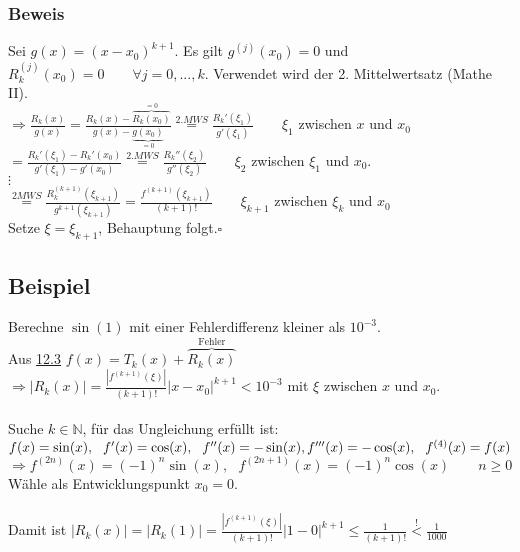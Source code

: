 \documentclass[a4paper, 12pt,titlepage, pdf, headsepline]{article}
\newcommand{\N}{\mathds{N}}
\newcommand{\qed}{\hfill$\square$}
\renewcommand{\>}{\rightarrow}
\renewcommand{\*}{\cdot}
\begin{document}
\subsubsection*{Beweis}
Sei $g(x) = (x-x_0)^{k+1}$. Es gilt $g^{(j)}(x_0) = 0$ und $R_k^{(j)}(x_0) = 0 \qquad \forall j = 0,...,k.$ Verwendet wird der 2. Mittelwertsatz (Mathe II).\\
$\Rightarrow \frac{R_k(x)}{g(x)} = \frac{R_k(x) - \overbrace{R_k(x_0)}^{=0}}{g(x) - \underbrace{g(x_0)}_{=0}} \overset{2.MWS}{=} \frac{R_k'(\xi_1)}{g'(\xi_1)} \qquad \xi_1$ zwischen $x$ und $x_0$\\
\noindent\hspace*{15mm}$= \frac{R_k'(\xi_1) - R_k'(x_0)}{g'(\xi_1) - g'(x_0)} \overset{2.MWS}{=} \frac{R_k''(\xi_2)}{g''(\xi_2)}\qquad \xi_2$ zwischen $\xi_1$ und $x_0$.\\
\noindent\hspace*{16mm}$\vdots$\\
\noindent\hspace*{11.5mm}$\overset{2MWS}{=} \frac{R_k^{(k+1)}(\xi_{k+1})}{g^{k+1}(\xi_{k+1})} = \frac{f^{(k+1)}(\xi_{k+1})}{(k+1)!}\qquad \xi_{k+1}$ zwischen $\xi_k$ und $x_0$\\
Setze $\xi = \xi_{k+1}$, Behauptung folgt.\qed
\subsection{Beispiel}
Berechne $\sin(1)$ mit einer Fehlerdifferenz kleiner als $10^{-3}$.\\
Aus \hyperref[12.3]{12.3} $f(x) = T_k(x) + \overbrace{R_k(x)}^{\text{Fehler}}$\\

$\Rightarrow |R_k(x)| = \frac{|f^{(k+1)}(\xi)|}{(k+1)!} |x - x_0|^{k+1} < 10^{-3}$ mit $\xi$ zwischen $x$ und $x_0$.\\
\\
Suche $k \in \N$, für das Ungleichung erfüllt ist: \\
$f(x) = \sin(x),~~ f'(x) = \cos(x),~~ f''(x) = -\sin(x),\\ f'''(x) = -\cos(x),~~f^{(4)}(x)=f(x)$\\

$\Rightarrow f^{(2n)}(x) = (-1)^n \sin(x),~~~ f^{(2n+1)}(x) = (-1)^n \cos(x) \qquad n \geq 0$\\
Wähle als Entwicklungspunkt $x_0 = 0$.\\
\\
Damit ist $|R_k(x)| = |R_k(1)| = \frac{|f^{(k+1)}(\xi)|}{(k+1)!} |1-0|^{k+1} \leq \frac{1}{(k+1)!} \overset{!}{<} \frac{1}{1000}$\\
\end{document}

